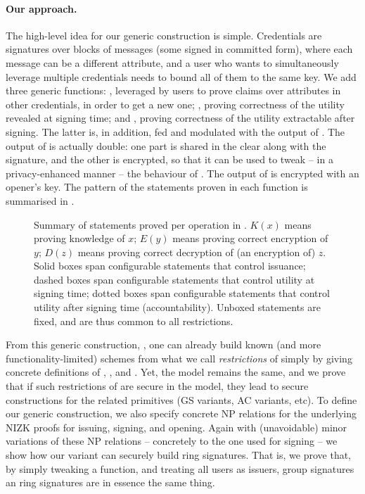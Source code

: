 \paragraph{Our approach.} %
The high-level idea for our generic construction is simple. Credentials are
signatures over blocks of messages (some signed in committed form), where each
message can be a different attribute, and a user who wants to simultaneously
leverage multiple credentials needs to bound all of them to the same key. We add
three generic functions: \fissue, leveraged by users to
prove claims over attributes in other credentials, in order to get a new one;
\feval, proving correctness of the utility revealed at signing time; and \finsp,
proving correctness of the utility extractable after signing. The latter is, in
addition, fed and modulated with the output of \feval. The output of \feval is
actually double: one part is shared in the clear along with the signature, and
the other is encrypted, so that it can be used to tweak -- in a privacy-enhanced
manner -- the behaviour of \finsp. The output of \finsp is encrypted with an
opener's key. The pattern of the statements proven in each function is
summarised in .

\begin{figure}[ht!]
  \centering
  
  \caption{Summary of statements proved per operation in \UAS.
    $K(x)$ means proving knowledge of $x$; $E(y)$ means proving correct
    encryption of $y$; $D(z)$ means proving correct decryption of (an encryption
    of) $z$. Solid boxes span configurable statements that control issuance;
    dashed boxes span configurable statements that control utility at signing
    time; dotted boxes span configurable statements that control utility after
    signing time (accountability). Unboxed statements are fixed, and are thus
    common to all \UAS restrictions.}
  \label{fig:proof-blocks-uas}
\end{figure}

From this generic construction, \CUASGen, one can already build known (and more
functionality-limited) schemes from what we call \emph{restrictions} of
\CUASGen simply by giving concrete definitions of \fissue, \feval, and \finsp.
Yet, the model remains the same, and we prove that if such restrictions of
\CUASGen are secure in the \UAS model, they lead to secure constructions for
the related primitives (GS variants, AC variants, etc). To define our generic
construction, we also specify concrete NP relations for the underlying NIZK
proofs for issuing, signing, and opening. Again with (unavoidable) minor variations
of these NP relations -- concretely to the one used for signing -- we show how
our \CUASGen variant can securely build ring signatures. That is, we prove that,
by simply tweaking a function, and treating all users as issuers, group
signatures an ring signatures are in essence the same thing.

